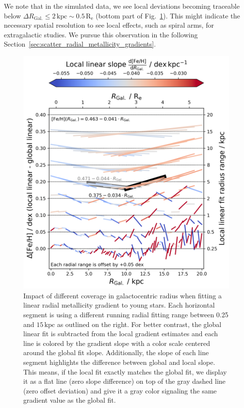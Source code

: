 \documentclass[fleqn,usenatbib]{mnras}
\begin{document}
We note that in the simulated data, we see local deviations becoming traceable below $\Delta R_\mathrm{Gal.} \leq 2\,\mathrm{kpc} \sim 0.5\,\mathrm{R_e}$ (bottom part of Fig.~\ref{fig:radial_range_impact}). This might indicate the necessary spatial resolution to see local effects, such as spiral arms, for extragalactic studies. We pursue this observation in the following Section~\ref{sec:scatter_radial_metallicity_gradients}.

\begin{figure}
    \centering
    \includegraphics[width=\columnwidth]{figures/radial_range_impact.png}
    \caption{Impact of different coverage in galactocentric radius when fitting a linear radial metallicity gradient to young stars. Each horizontal segment is using a different running radial fitting range between 0.25 and $15\,\mathrm{kpc}$ as outlined on the right. For better contrast, the global linear fit is subtracted from the local gradient estimates and each line is colored by the gradient slope with a color scale centered around the global fit slope. Additionally, the slope of each line segment highlights the difference between global and local slope. This means, if the local fit exactly matches the global fit, we display it as a flat line (zero slope difference) on top of the gray dashed line (zero offset deviation) and give it a gray color signaling the same gradient value as the global fit.}
    \label{fig:radial_range_impact}
\end{figure}
\end{document}
